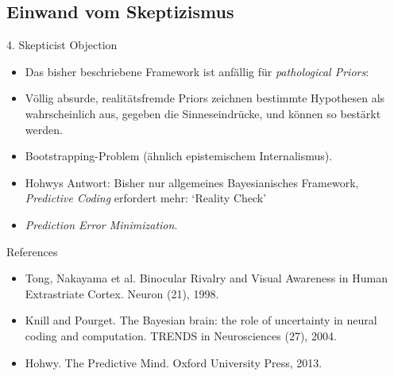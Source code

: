 \documentclass[11pt, handout]{beamer}
\begin{document}
\subsection{Einwand vom Skeptizismus}

\begin{frame} {\large 4. Skepticist Objection}
  \begin{itemize}[<+->]
  \item Das bisher beschriebene Framework ist anfällig für
    \emph{pathological Priors}:
  \item Völlig absurde, realitätsfremde Priors zeichnen bestimmte
    Hypothesen als wahrscheinlich aus, gegeben die Sinneseindrücke,
    und können so bestärkt werden.
  \item Bootstrapping-Problem (ähnlich epistemischem Internalismus).
  \item Hohwys Antwort: Bisher nur allgemeines Bayesianisches
    Framework, \emph{Predictive Coding} erfordert mehr: `Reality
    Check'
  \item \emph{Prediction Error Minimization}.
  \end{itemize}
\end{frame}

\begin{frame}

  {\Large References}

  \begin{itemize}
  \item Tong, Nakayama et al. Binocular Rivalry and Visual Awareness
    in Human Extrastriate Cortex. Neuron (21), 1998.
  \item Knill and Pourget. The Bayesian brain: the role of uncertainty
    in neural coding and computation. TRENDS in Neurosciences (27),
    2004.
  \item Hohwy. The Predictive Mind. Oxford University Press, 2013.

  \end{itemize}


\end{frame}
\end{document}
